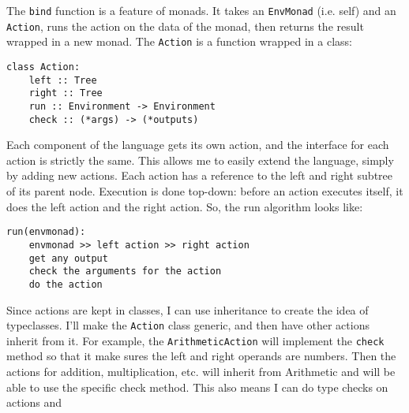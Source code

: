 \documentclass[a4paper, 12pt]{article}
\begin{document}
The \verb|bind| function is a feature of monads. It takes an \verb|EnvMonad| (i.e. self) and an \verb|Action|, runs the action on the data of the monad, then returns the result wrapped in a new monad. The \verb|Action| is a function wrapped in a class:
\begin{verbatim}
class Action:
    left :: Tree
    right :: Tree
    run :: Environment -> Environment
    check :: (*args) -> (*outputs)
\end{verbatim}

Each component of the language gets its own action, and the interface for each action is strictly the same. This allows me to easily extend the language, simply by adding new actions. Each action has a reference to the left and right subtree of its parent node. Execution is done top-down: before an action executes itself, it does the left action and the right action. So, the run algorithm looks like:

\begin{verbatim}
run(envmonad):
    envmonad >> left action >> right action
    get any output
    check the arguments for the action
    do the action
\end{verbatim}

Since actions are kept in classes, I can use inheritance to create the idea of typeclasses. I'll make the \verb|Action| class generic, and then have other actions inherit from it. For example, the \verb|ArithmeticAction| will implement the \verb|check| method so that it make sures the left and right operands are numbers. Then the actions for addition, multiplication, etc. will inherit from Arithmetic and will be able to use the specific check method. This also means I can do type checks on actions and 
\\
\end{document}
